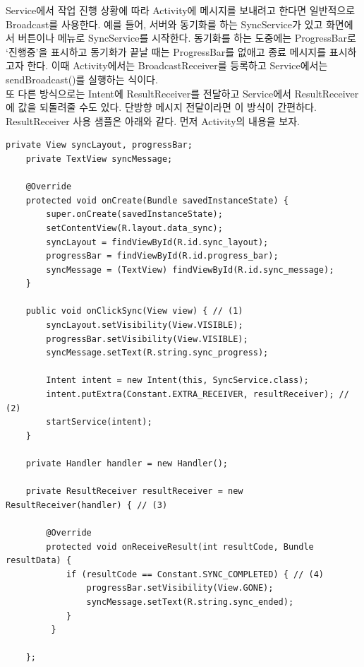 Service에서 작업 진행 상황에 따라 Activity에 메시지를 보내려고 한다면 일반적으로 Broadcast를 사용한다.
예를 들어, 서버와 동기화를 하는 SyncService가 있고 화면에서 버튼이나 메뉴로 SyncService를 시작한다. 
동기화를 하는 도중에는 ProgressBar로 `진행중'을 표시하고 동기화가 끝날 때는 ProgressBar를 없애고 종료 메시지를 표시하고자 한다.
이때 Activity에서는 BroadcastReceiver를 등록하고 Service에서는 sendBroadcast()를 실행하는 식이다.\\

또 다른 방식으로는 Intent에 ResultReceiver를 전달하고 Service에서 ResultReceiver에 값을 되돌려줄 수도 있다. 단방향 메시지 전달이라면 이 방식이 간편하다.\\

ResultReceiver 사용 샘플은 아래와 같다. 먼저 Activity의 내용을 보자. 
\begin{lstlisting}[frame=single]
	private View syncLayout, progressBar;
	private TextView syncMessage;

	@Override
	protected void onCreate(Bundle savedInstanceState) {
   		super.onCreate(savedInstanceState);
   		setContentView(R.layout.data_sync);
   		syncLayout = findViewById(R.id.sync_layout);
   		progressBar = findViewById(R.id.progress_bar);
  	 	syncMessage = (TextView) findViewById(R.id.sync_message);
	}

	public void onClickSync(View view) { // (1)
   		syncLayout.setVisibility(View.VISIBLE);
   		progressBar.setVisibility(View.VISIBLE);
   		syncMessage.setText(R.string.sync_progress);

   		Intent intent = new Intent(this, SyncService.class);
   		intent.putExtra(Constant.EXTRA_RECEIVER, resultReceiver); // (2)
   		startService(intent);
	}

	private Handler handler = new Handler();

	private ResultReceiver resultReceiver = new ResultReceiver(handler) { // (3)

   		@Override
   		protected void onReceiveResult(int resultCode, Bundle resultData) {
      		if (resultCode == Constant.SYNC_COMPLETED) { // (4)
         		progressBar.setVisibility(View.GONE);
        		syncMessage.setText(R.string.sync_ended); 
      		}
  		 }

	};	
\end{lstlisting}
